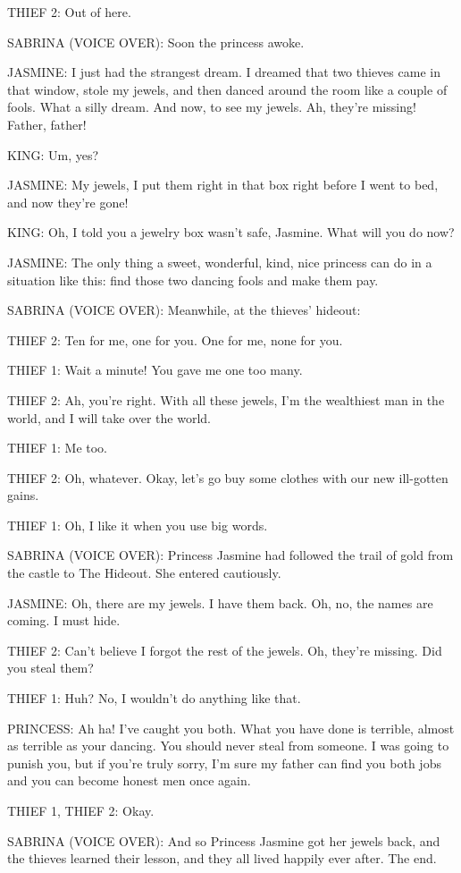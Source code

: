 THIEF 2:
Out of here.

SABRINA (VOICE OVER):
Soon the princess awoke.

JASMINE:
I just had the strangest dream.
I dreamed that two thieves came in that window, stole my jewels, and then danced around the room like a couple of fools.
What a silly dream.
And now, to see my jewels.
Ah, they're missing!
Father, father!

KING:
Um, yes?

JASMINE:
My jewels, I put them right in that box right before I went to bed, and now they're gone!

KING:
Oh, I told you a jewelry box wasn't safe, Jasmine.
What will you do now?

JASMINE:
The only thing a sweet, wonderful, kind, nice princess can do in a situation like this: find those two dancing fools and make them pay.

SABRINA (VOICE OVER):
Meanwhile, at the thieves' hideout:

THIEF 2:
Ten for me, one for you.
One for me, none for you.

THIEF 1:
Wait a minute!
You gave me one too many.

THIEF 2:
Ah, you're right.
With all these jewels, I'm the wealthiest man in the world, and I will take over the world.

THIEF 1:
Me too.

THIEF 2:
Oh, whatever.
Okay, let's go buy some clothes with our new ill-gotten gains.

THIEF 1:
Oh, I like it when you use big words.

SABRINA (VOICE OVER):
Princess Jasmine had followed the trail of gold from the castle to The Hideout.
She entered cautiously.

JASMINE:
Oh, there are my jewels.
I have them back.
Oh, no, the names are coming.
I must hide.

THIEF 2:
Can't believe I forgot the rest of the jewels.
Oh, they're missing.
Did you steal them?

THIEF 1:
Huh? No, I wouldn't do anything like that.

PRINCESS:
Ah ha! I've caught you both.
What you have done is terrible, almost as terrible as your dancing.
You should never steal from someone.
I was going to punish you, but if you're truly sorry, I'm sure my father can find you both jobs and you can become honest men once again.

THIEF 1, THIEF 2:
Okay.

SABRINA (VOICE OVER):
And so Princess Jasmine got her jewels back, and the thieves learned their lesson, and they all lived happily ever after.
The end.


